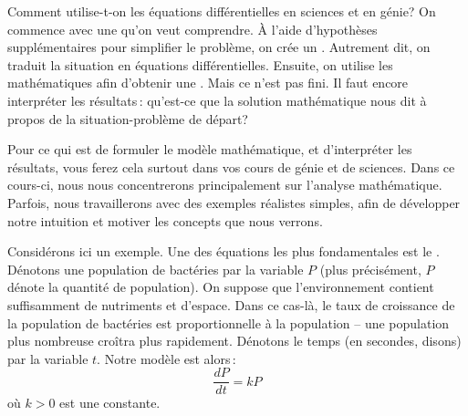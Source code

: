 Comment utilise-t-on les \'equations diff\'erentielles en sciences et en g\'enie?  On commence avec une \emph{} qu'on veut comprendre.  \`A l'aide d'hypoth\`eses suppl\'ementaires pour simplifier le probl\`eme, on cr\'ee un 
\emph{}.  Autrement dit, on traduit la situation en \'equations diff\'erentielles.  Ensuite, on utilise les math\'ematiques afin d'obtenir une \emph{}.  Mais ce n'est pas fini.  Il faut encore interpr\'eter les r\'esultats\,: qu'est-ce que la solution math\'ematique nous dit \`a propos de la situation-probl\`eme de d\'epart?

Pour ce qui est de formuler le mod\`ele math\'ematique, et d'interpr\'eter les r\'esultats, vous ferez cela surtout dans vos cours de g\'enie et de sciences.  Dans ce cours-ci, nous nous concentrerons principalement sur l'analyse math\'ematique.  Parfois, nous travaillerons avec des exemples r\'ealistes simples, afin de d\'evelopper notre intuition et motiver les concepts que nous verrons.

Consid\'erons ici un exemple.  Une des \'equations les plus fondamentales est le \emph{}.  D\'enotons une population de bact\'eries par la variable $P$ (plus pr\'ecis\'ement, $P$ d\'enote la quantit\'e de population).  On suppose que l'environnement contient suffisamment de nutriments et d'espace.  Dans ce cas-l\`a, le taux de croissance de la population de bact\'eries est proportionnelle \`a la population -- une population plus nombreuse cro\^itra plus rapidement.  D\'enotons le temps (en secondes, disons) par la variable $t$.  Notre mod\`ele est alors\,: 
%
\begin{equation*}
\frac{dP}{dt} = kP 
\end{equation*}
o\`u $k > 0$ est une constante.

